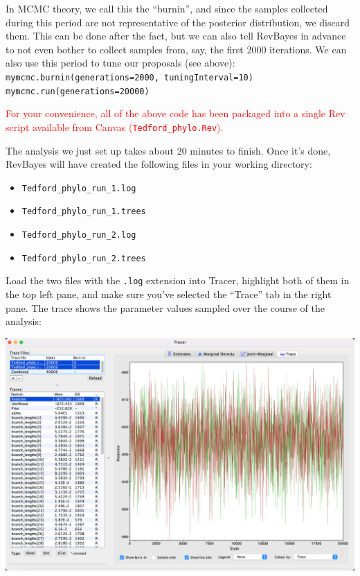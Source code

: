 \documentclass[12pt]{article}
\begin{document}
\noindent In MCMC theory, we call this the ``burnin'', and since the samples collected during this period are not representative of the posterior distribution, we discard them. This can be done after the fact, but we can also tell RevBayes in advance to not even bother to collect samples from, say, the first 2000 iterations. We can also use this period to tune our proposals (see above): \\

\indent \texttt{mymcmc.burnin(generations=2000, tuningInterval=10)} \\
\indent \texttt{mymcmc.run(generations=20000)}

\begin{center}
\textcolor{red}{For your convenience, all of the above code has been packaged into a single Rev script available from Canvas (\texttt{Tedford\_phylo.Rev}).}
\end{center}

\noindent The analysis we just set up takes about 20 minutes to finish. Once it's done, RevBayes will have created the following files in your working directory:

\begin{itemize}
\setlength\itemsep{-0.3em}
  \item \texttt{Tedford\_phylo\_run\_1.log}
  \item  \texttt{Tedford\_phylo\_run\_1.trees}
  \item  \texttt{Tedford\_phylo\_run\_2.log}
  \item  \texttt{Tedford\_phylo\_run\_2.trees}
\end{itemize}

\noindent Load the two files with the \texttt{.log} extension into Tracer, highlight both of them in the top left pane, and make sure you've selected the ``Trace'' tab in the right pane. The trace shows the parameter values sampled over the course of the analysis: \\

\begin{center}
\noindent\includegraphics[height=0.54\textwidth]{traces.png}
\end{center}
\end{document}
